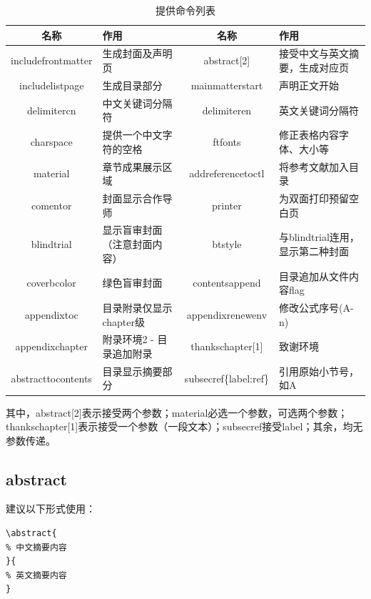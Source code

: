 \documentclass{nuistthesis}
\begin{document}
\begin{table}[htbp!]
\centering
\ftfonts
\caption{提供命令列表} \label{tab:providecommand}
    \begin{tabular}{c l | c l}
        \hline
        名称 & 作用 & 名称 & 作用\\
        \hline
        includefrontmatter & 生成封面及声明页 & abstract[2] & 接受中文与英文摘要，生成对应页 \\
        includelistpage & 生成目录部分 & mainmatterstart & 声明正文开始 \\
        delimitercn & 中文关键词分隔符 & delimiteren & 英文关键词分隔符 \\
        charspace & 提供一个中文字符的空格 & ftfonts & 修正表格内容字体、大小等 \\
        material & 章节成果展示区域 & addreferencetoctl & 将参考文献加入目录\\
        comentor & 封面显示合作导师 & printer & 为双面打印预留空白页 \\
        blindtrial & 显示盲审封面（注意封面内容）& btstyle & 与blindtrial连用，显示第二种封面 \\
        coverbcolor & 绿色盲审封面 & contentsappend & 目录追加从文件内容flag \\
        appendixtoc & 目录附录仅显示chapter级 & appendixrenewenv & 修改公式序号(A-n) \\
        appendixchapter & 附录环境2 - 目录追加附录 & thankschapter[1] & 致谢环境 \\
        abstracttocontents & 目录显示摘要部分 & subsecref\{label:ref\} & 引用原始小节号，如A \\
        \hline
    \end{tabular}
\end{table}

其中，abstract[2]表示接受两个参数；material必选一个参数，可选两个参数；thankschapter[1]表示接受一个参数（一段文本）；subsecref接受label；其余，均无参数传递。

\subsection{abstract}

建议以下形式使用：

\begin{lstlisting}
\abstract{
% 中文摘要内容
}{
% 英文摘要内容
}
\end{lstlisting}
\end{document}
